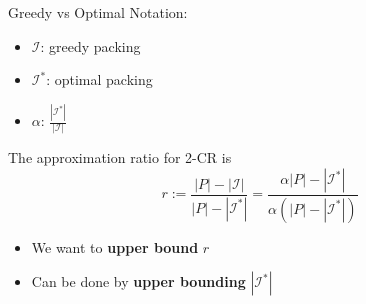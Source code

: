 \begin{frame}{Greedy vs Optimal}
Notation:
\begin{itemize}
\pause\item
\alert{$\mathcal{I}$}: greedy packing

\pause\item
\alert{$\mathcal{I}^*$}: optimal packing

\pause\item
\alert{$\alpha$}: $\frac{|\mathcal{I}^*|}{|\mathcal{I}|}$ 

\end{itemize}

\pause
\begin{observation}
The approximation ratio for 2-CR is
$$ r := 
\frac{|P| - |\mathcal{I}|}{|P| - |\mathcal{I}^*|} = 
\frac{\alpha |P| - |\mathcal{I}^*|}{\alpha (|P| - |\mathcal{I}^*|)}
$$
\end{observation}

\begin{itemize}
\pause\item
We want to \textbf{upper bound} $r$
\pause\item
Can be done by \textbf{upper bounding} $|\mathcal{I}^*|$
\end{itemize}


\end{frame}